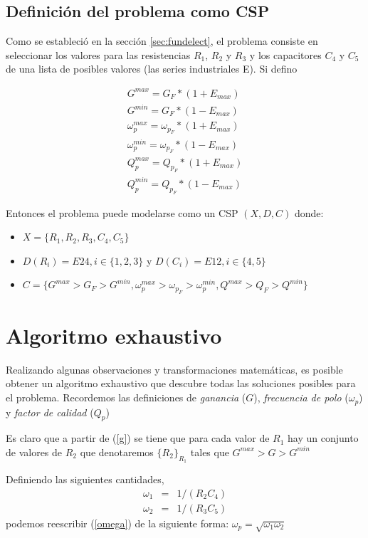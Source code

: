 \documentclass{llncs}
\begin{document}
	\subsection{Definición del problema como CSP}
		\label{subsec:problemDefinition}
		Como se estableció en la sección \ref{sec:fundelect}, el problema consiste en seleccionar
		los valores para las resistencias $R_1$, $R_2$ y $R_3$ y los capacitores $C_4$ y $C_5$ de
		una lista de posibles valores (las series industriales E). Si defino
		
		\begin{align*}
		G^{max} = G_F * (1 + E_{max})\\
		G^{min} = G_F * (1 - E_{max})\\
		\omega_p^{max} = \omega_{p_F} * (1 + E_{max})\\
		\omega_p^{min} = \omega_{p_F} * (1 - E_{max})\\
		Q_p^{max} = Q_{p_F} * (1 + E_{max})\\
		Q_p^{min} = Q_{p_F} * (1 - E_{max})
		\end{align*}
		
		Entonces el problema puede modelarse como un CSP $(X, D, C)$ donde:
		
		\begin{itemize}
			\item $X = \{R_1, R_2, R_3, C_4, C_5\}$
			\item $D(R_i) = E24, i \in \{1,2,3\}$ y $D(C_i) = E12, i \in \{4,5\}$
			\item $C = \{G^{max} > G_F > G^{min}, \omega_p^{max} > \omega_{p_F} > \omega_p^{min},
			Q^{max} > Q_F > Q^{min}\}$
		\end{itemize}
    

  \section{\textbf{Algoritmo exhaustivo}}
  	\label{sec:exhaustSearch}
    Realizando algunas observaciones y transformaciones matem\'aticas, es posible obtener un algoritmo exhaustivo que descubre
    todas las soluciones posibles para el problema. Recordemos las definiciones
    de \textit{ganancia} ($G$), \textit{frecuencia de polo} ($\omega_p$) y
    \textit{factor de calidad} ($Q_p$)


    Es claro que a partir de (\ref{g}) se tiene que para cada valor de $R_1$ hay
    un conjunto de valores de $R_2$ que denotaremos 
    $\{R_2\}_{R_1}$ tales que $G^{max} > G > G^{min}$

    Definiendo las siguientes cantidades,
    \begin{eqnarray}
      \omega_1 &=& 1/(R_2 C_4) \nonumber \\
      \omega_2 &=& 1/(R_3 C_5)
      \label{omegas}
    \end{eqnarray}
    podemos reescribir (\ref{omega}) de la siguiente forma: $\omega_p = \sqrt{\omega_1  \omega_2}$
\end{document}
